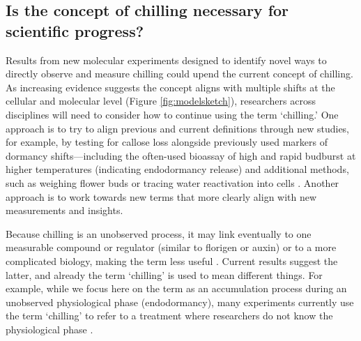 \documentclass[11pt]{article}
\begin{document}
\subsection*{Is the concept of chilling necessary for scientific progress?}  

Results from new molecular experiments designed to identify novel ways to directly observe and measure chilling could upend the current concept of chilling. As increasing evidence suggests the concept aligns with multiple shifts at the cellular and molecular level (Figure \ref{fig:modelsketch}), researchers across disciplines will need to consider how to continue using the term `chilling.' One approach is to try to align previous and current definitions through new studies, 
for example, by testing for callose loss \citep{yu2024building} alongside previously used markers of dormancy shifts---including the often-used bioassay of high and rapid budburst at higher temperatures (indicating endodormancy release) and additional methods, such as weighing flower buds \citep{chuine2016} or tracing water reactivation into cells \citep{faust1991bound,Kalcsits2009,walde2024stable}. 
Another approach is to work towards new terms that more clearly align with new measurements and insights. 

Because chilling is an unobserved process, it may link eventually to one measurable compound or regulator (similar to florigen or auxin) or to a more complicated biology, making the term less useful \citep{aksenova2006florigen}. Current results suggest the latter, and already the term `chilling' is used to mean different things. For example, while we focus here on the term as an accumulation process during an unobserved physiological phase (endodormancy), many experiments currently use the term `chilling' to refer to a treatment where researchers do not know the physiological phase \citep[for example, cuttings or buds from woody plants are often chilled at 5\degree C for 6 weeks in the dark in a `chilling' treatment, then transferred to warm `forcing' conditions,][]{flynn2018,ospreebbms}.  
\end{document}
